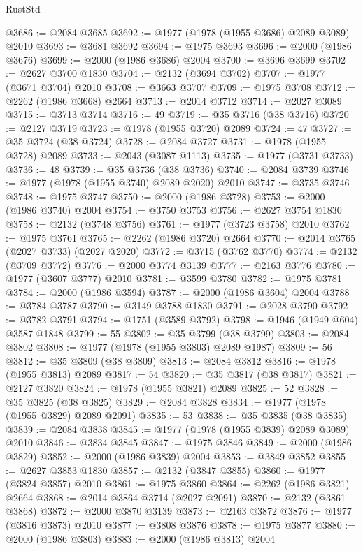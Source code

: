 \begin{lexlean}{RustStd}
\begin{coremodule}
{\begin{coremodule}
{{{{{{{{{{{{{{{{{{{{{{{{{{{{{{{@3686 := @2084 @3685
@3692 := @1977 (@1978 (@1955 @3686) @2089 @3089) @2010
@3693 := @3681 @3692
@3694 := @1975 @3693
@3696 := @2000 (@1986 @3676)
@3699 := @2000 (@1986 @3686) @2004
@3700 := @3696 @3699
@3702 := @2627 @3700 @1830
@3704 := @2132 (@3694 @3702)
@3707 := @1977 (@3671 @3704) @2010
@3708 := @3663 @3707
@3709 := @1975 @3708
@3712 := @2262 (@1986 @3668) @2664
@3713 := @2014 @3712
@3714 := @2027 @3089
@3715 := @3713 @3714
@3716 := 49
@3719 := @35 @3716 (@38 @3716)
@3720 := @2127 @3719
@3723 := @1978 (@1955 @3720) @2089
@3724 := 47
@3727 := @35 @3724 (@38 @3724)
@3728 := @2084 @3727
@3731 := @1978 (@1955 @3728) @2089
@3733 := @2043 (@3087 @1113)
@3735 := @1977 (@3731 @3733)
@3736 := 48
@3739 := @35 @3736 (@38 @3736)
@3740 := @2084 @3739
@3746 := @1977 (@1978 (@1955 @3740) @2089 @2020) @2010
@3747 := @3735 @3746
@3748 := @1975 @3747
@3750 := @2000 (@1986 @3728)
@3753 := @2000 (@1986 @3740) @2004
@3754 := @3750 @3753
@3756 := @2627 @3754 @1830
@3758 := @2132 (@3748 @3756)
@3761 := @1977 (@3723 @3758) @2010
@3762 := @1975 @3761
@3765 := @2262 (@1986 @3720) @2664
@3770 := @2014 @3765 (@2027 @3733) (@2027 @2020)
@3772 := @3715 (@3762 @3770)
@3774 := @2132 (@3709 @3772)
@3776 := @2000 @3774 @3139
@3777 := @2163 @3776
@3780 := @1977 (@3607 @3777) @2010
@3781 := @3599 @3780
@3782 := @1975 @3781
@3784 := @2000 (@1986 @3594)
@3787 := @2000 (@1986 @3604) @2004
@3788 := @3784 @3787
@3790 := @3149 @3788 @1830
@3791 := @2028 @3790
@3792 := @3782 @3791
@3794 := @1751 (@3589 @3792)
@3798 := @1946 (@1949 @604) @3587 @1848
@3799 := 55
@3802 := @35 @3799 (@38 @3799)
@3803 := @2084 @3802
@3808 := @1977 (@1978 (@1955 @3803) @2089 @1987)
@3809 := 56
@3812 := @35 @3809 (@38 @3809)
@3813 := @2084 @3812
@3816 := @1978 (@1955 @3813) @2089
@3817 := 54
@3820 := @35 @3817 (@38 @3817)
@3821 := @2127 @3820
@3824 := @1978 (@1955 @3821) @2089
@3825 := 52
@3828 := @35 @3825 (@38 @3825)
@3829 := @2084 @3828
@3834 := @1977 (@1978 (@1955 @3829) @2089 @2091)
@3835 := 53
@3838 := @35 @3835 (@38 @3835)
@3839 := @2084 @3838
@3845 := @1977 (@1978 (@1955 @3839) @2089 @3089) @2010
@3846 := @3834 @3845
@3847 := @1975 @3846
@3849 := @2000 (@1986 @3829)
@3852 := @2000 (@1986 @3839) @2004
@3853 := @3849 @3852
@3855 := @2627 @3853 @1830
@3857 := @2132 (@3847 @3855)
@3860 := @1977 (@3824 @3857) @2010
@3861 := @1975 @3860
@3864 := @2262 (@1986 @3821) @2664
@3868 := @2014 @3864 @3714 (@2027 @2091)
@3870 := @2132 (@3861 @3868)
@3872 := @2000 @3870 @3139
@3873 := @2163 @3872
@3876 := @1977 (@3816 @3873) @2010
@3877 := @3808 @3876
@3878 := @1975 @3877
@3880 := @2000 (@1986 @3803)
@3883 := @2000 (@1986 @3813) @2004
}}}}}}}}}}}}}}}}}}}}}}}}}}}}}}}
\end{coremodule}}
\end{coremodule}
\end{lexlean}
